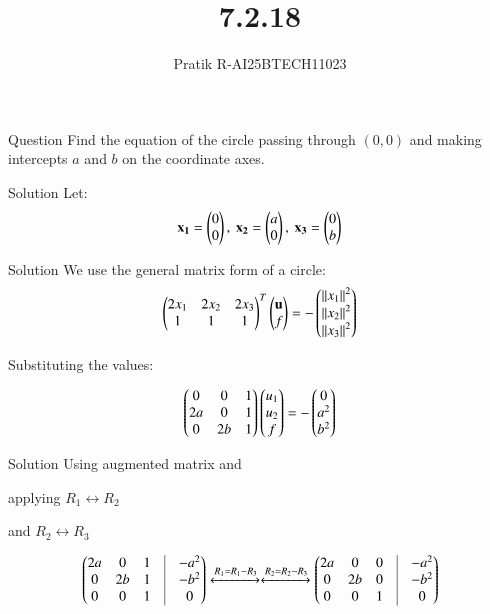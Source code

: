 \documentclass{beamer}
\title 
{7.2.18}
\author 
{Pratik R-AI25BTECH11023}
\begin{document}
\frame{\titlepage}
\begin{frame}{Question}
Find the equation of the circle passing through $(0, 0)$ and making intercepts $a$ and $b$ on the coordinate axes.
\end{frame}
\begin{frame}{Solution}
Let:
\begin{align}
\mathbf{x_1} = \begin{pmatrix}0 \\ 0\end{pmatrix},\ \mathbf{x_2} = \begin{pmatrix}a \\ 0\end{pmatrix},\ \mathbf{x_3} = \begin{pmatrix}0 \\ b\end{pmatrix}
\end{align}
\end{frame}
\begin{frame}{Solution}
We use the general matrix form of a circle:
\begin{align}
\begin{pmatrix}2x_1 & 2x_2 & 2x_3\\
1 & 1 & 1\end{pmatrix}^T \begin{pmatrix}\mathbf{u} \\ f\end{pmatrix} = - \begin{pmatrix}\left\lVert x_1\right\rVert^2 \\ \left\lVert x_2\right\rVert^2 \\ \left\lVert x_3\right\rVert^2\end{pmatrix}
\end{align}

Substituting the values:

\begin{align}
\begin{pmatrix}
0 & 0 & 1 \\
2a & 0 & 1 \\
0 & 2b & 1
\end{pmatrix}
\begin{pmatrix}
u_1 \\
u_2 \\
f
\end{pmatrix}
=
- \begin{pmatrix}
0 \\
a^2 \\
b^2
\end{pmatrix}
\end{align}
\end{frame}
\begin{frame}{Solution}
Using augmented matrix and

applying $R_1\leftrightarrow R_2$

and $R_2\leftrightarrow R_3$

\begin{align}
\myvec{
2a & 0 & 1 &\vrule &-a^2 \\ 
0 & 2b & 1 &\vrule &-b^2\\
0 & 0 & 1 &\vrule &0 
} \xleftrightarrow{R_1=R_1 - R_3}\xleftrightarrow{R_2=R_2 - R_3}
\myvec{
2a & 0 & 0 &\vrule &-a^2 \\ 
0 & 2b & 0 &\vrule &-b^2\\
0 & 0 & 1 &\vrule &0 
}
\end{align}
\end{frame}
\end{document}
